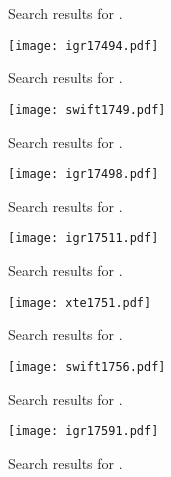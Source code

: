 \begin{subappendices}
\begin{figure*}
\begin{subfigure}[t]{\textwidth}
		\caption{Search results for \ngc.}
		\label{fig:amxp_ngc}	
	\end{subfigure}
	\par\vspace{2em} %
	\begin{subfigure}[t]{\textwidth}
		\texttt{[image: igr17494.pdf]}
		\caption{Search results for \igri.}
		\label{fig:amxp_igri}	
	\end{subfigure}
	\par\vspace{2em} %
	\begin{subfigure}[t]{\textwidth}
		\texttt{[image: swift1749.pdf]}
		\caption{Search results for \swiftb.}
		\label{fig:amxp_swiftb}	
	\end{subfigure}
\end{figure*}
%
\begin{figure*}
	\ContinuedFloat
	\centering
	\begin{subfigure}[t]{\textwidth}
		\texttt{[image: igr17498.pdf]}
		\caption{Search results for \igre.}
		\label{fig:amxp_igre}	
	\end{subfigure}
	\par\vspace{2em} %
	\begin{subfigure}[t]{\textwidth}
		\texttt{[image: igr17511.pdf]}
		\caption{Search results for \igrf.}
		\label{fig:amxp_igrf}	
	\end{subfigure}
	\par\vspace{2em} %
	\begin{subfigure}[t]{\textwidth}
		\texttt{[image: xte1751.pdf]}
		\caption{Search results for \xteb.}
		\label{fig:amxp_xteb}	
	\end{subfigure}
	\par\vspace{2em} %
	\begin{subfigure}[t]{\textwidth}
		\texttt{[image: swift1756.pdf]}
		\caption{Search results for \swift.}
		\label{fig:amxp_swift}	
	\end{subfigure}
	\par\vspace{2em} %
	\begin{subfigure}[t]{\textwidth}
		\texttt{[image: igr17591.pdf]}
		\caption{Search results for \igrg.}
		\label{fig:amxp_igrg}	
	\end{subfigure}
\end{figure*}

\end{subappendices}
